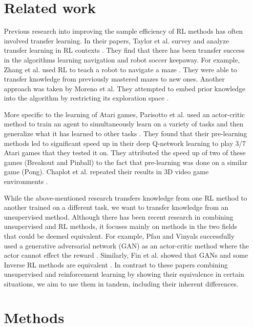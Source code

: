\documentclass{article}
\begin{document}
\section{Related work}

Previous research into improving the sample efficiency of RL methods has often involved transfer learning.
In their papers, Taylor et al. survey and analyze transfer learning in RL contexts \cite{taylor:transfer,taylor:introduction}.
They find that there has been transfer success in the algorithms learning navigation and robot soccer keepaway.
For example, Zhang et al. used RL to teach a robot to navigate a maze \cite{zhang:deep}.
They were able to transfer knowledge from previously mastered mazes to new ones.
Another approach was taken by Moreno et al.
They attempted to embed prior knowledge into the algorithm by restricting its exploration space \cite{moreno:using}.

More specific to the learning of Atari games, Parisotto et al. used an actor-critic method to train an agent to simultaneously learn on a variety of tasks and then generalize what it has learned to other tasks \cite{parisotto:actor}.
They found that their pre-learning methods led to significant speed up in their deep Q-network learning to play 3/7 Atari games that they tested it on.
They attributed the speed up of two of these games (Breakout and Pinball) to the fact that pre-learning was done on a similar game (Pong). 
Chaplot et al. repeated their results in 3D video game environments \cite{chaplot:complex}.

While the above-mentioned research transfers knowledge from one RL method to another trained on a different task, we want to transfer knowledge from an unsupervised method.
Although there has been recent research in combining unsupervised and RL methods, it focuses mainly on methods in the two fields that could be deemed equivalent.
For example, Pfau and Vinyals successfully used a generative adversarial network (GAN) as an actor-critic method where the actor cannot effect the reward  \cite{pfau:connecting}.
Similarly, Fin et al. showed that GANs and some Inverse RL methods are equivalent \cite{finn:connection}.
In contrast to these papers combining unsupervised and reinforcement learning by showing their equivalence in certain situations, we aim to use them in tandem, including their inherent differences.

\section{Methods}
\end{document}
